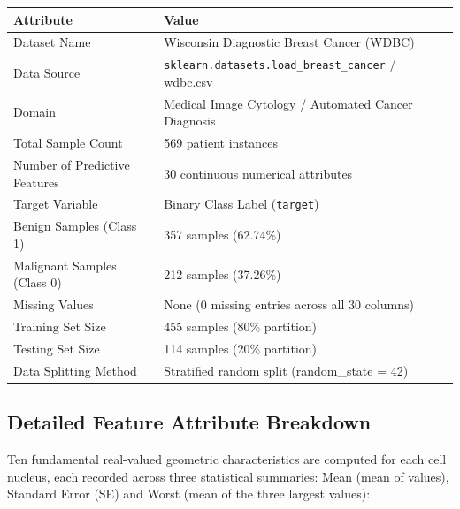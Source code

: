 \documentclass[12pt,a4paper]{article}
\begin{document}
\begin{longtable}{|p{6cm}|p{8cm}|}
\hline
\textbf{Attribute} & \textbf{Value} \\ \hline
Dataset Name & Wisconsin Diagnostic Breast Cancer (WDBC) \\ \hline
Data Source & \texttt{sklearn.datasets.load\_breast\_cancer} / wdbc.csv \\ \hline
Domain & Medical Image Cytology / Automated Cancer Diagnosis \\ \hline
Total Sample Count & 569 patient instances \\ \hline
Number of Predictive Features & 30 continuous numerical attributes \\ \hline
Target Variable & Binary Class Label (\texttt{target}) \\ \hline
Benign Samples (Class 1) & 357 samples (62.74\%) \\ \hline
Malignant Samples (Class 0) & 212 samples (37.26\%) \\ \hline
Missing Values & None (0 missing entries across all 30 columns) \\ \hline
Training Set Size & 455 samples (80\% partition) \\ \hline
Testing Set Size & 114 samples (20\% partition) \\ \hline
Data Splitting Method & Stratified random split (random\_state = 42) \\ \hline
\end{longtable}

\subsection*{Detailed Feature Attribute Breakdown}

Ten fundamental real-valued geometric characteristics are computed for each cell nucleus, each recorded across three statistical summaries: Mean (mean of values), Standard Error (SE) and Worst (mean of the three largest values):
\end{document}
